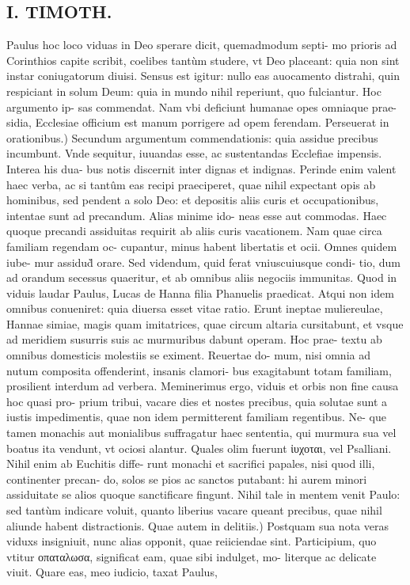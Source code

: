 \documentclass{article}
\begin{document}
\begin{pages}
\section*{I. TIMOTH. }
\marginpar{[ p.58]}\pstart Paulus hoc loco viduas in Deo sperare dicit, quemadmodum septi- mo prioris ad Corinthios capite scribit, coelibes tantùm studere, vt Deo placeant: quia non sint instar coniugatorum diuisi. Sensus est igitur: nullo eas auocamento distrahi, quin respiciant in solum Deum: quia in mundo nihil reperiunt, quo fulciantur. Hoc argumento ip- sas commendat. Nam vbi deficiunt humanae opes omniaque prae- sidia, Ecclesiae officium est manum porrigere ad opem ferendam.  \pend\pstart Perseuerat in orationibus.) Secundum argumentum commendationis: quia assidue precibus incumbunt. Vnde sequitur, iuuandas esse, ac sustentandas Ecclefiae impensis. Interea his dua- bus notis discernit inter dignas et indignas. Perinde enim valent haec verba, ac si tantûm eas recipi praeciperet, quae nihil expectant opis ab hominibus, sed pendent a solo Deo: et depositis aliis curis et occupationibus, intentae sunt ad precandum. Alias minime ido- neas esse aut commodas. Haec quoque precandi assiduitas requirit ab aliis curis vacationem. Nam quae circa familiam regendam oc- cupantur, minus habent libertatis et ocii. Omnes quidem iube- mur assidud̀ orare. Sed videndum, quid ferat vniuscuiusque condi- tio, dum ad orandum secessus quaeritur, et ab omnibus aliis negociis immunitas. Quod in viduis laudar Paulus, Lucas de Hanna filia Phanuelis praedicat. Atqui non idem omnibus conueniret: quia diuersa esset vitae ratio. Erunt ineptae muliereulae, Hannae simiae, magis quam imitatrices, quae circum altaria cursitabunt, et vsque ad meridiem susurris suis ac murmuribus dabunt operam. Hoc prae- textu ab omnibus domesticis molestiis se eximent. Reuertae do- mum, nisi omnia ad nutum composita offenderint, insanis clamori- bus exagitabunt totam familiam, prosilient interdum ad verbera. Meminerimus ergo, viduis et orbis non fine causa hoc quasi pro- prium tribui, vacare dies et nostes precibus, quia solutae sunt a iustis impedimentis, quae non idem permitterent familiam regentibus. Ne- que tamen monachis aut monialibus suffragatur haec sententia, qui murmura sua vel boatus ita vendunt, vt ociosi alantur. Quales olim fuerunt ἰυχοται, vel Psalliani. Nihil enim ab Euchitis diffe- runt monachi et sacrifici papales, nisi quod illi, continenter precan- do, solos se pios ac sanctos putabant: hi aurem minori assiduitate se alios quoque sanctificare fingunt. Nihil tale in mentem venit Paulo: sed tantùm indicare voluit, quanto liberius vacare queant precibus, quae nihil aliunde habent distractionis.  \pend\pstart Quae autem in delitiis.) Postquam sua nota veras viduxs insigniuit, nunc alias opponit, quae reiiciendae sint. Participium, quo vtitur οπαταλωσα, significat eam, quae sibi indulget, mo- literque ac delicate viuit. Quare eas, meo iudicio, taxat Paulus,  \pend

\end{pages}
\end{document}
